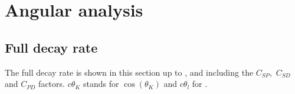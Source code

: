 \chapter{Angular analysis}\label{app:BsJpsiKst_angana}
\section{Full decay rate}\label{app:BsJpsiKst_angana_drate}
The full decay rate is shown in this section up to \dwave, and including the $C_{SP}$,~$C_{SD}$ and $C_{PD}$ factors. $ c\theta_{K}$ stands for $\cos(\theta_K)$ and $ c\theta_{l}$ for \cosTmu. 

